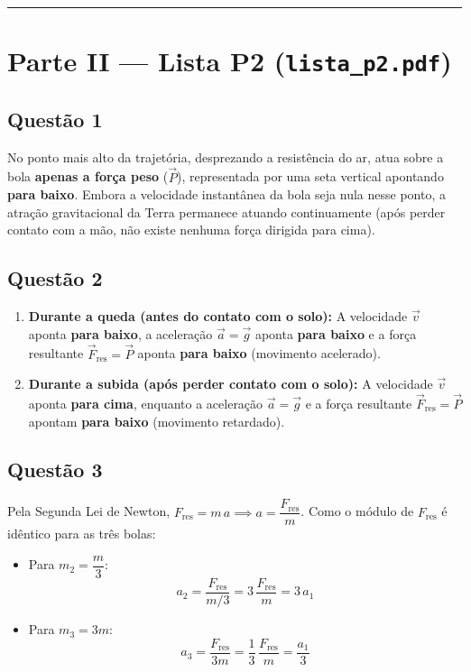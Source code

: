 \documentclass[11pt, a4paper]{article}
\begin{document}
\vspace{6pt}
\hrule
\vspace{8pt}

\section*{\color{primary} Parte II --- Lista P2 (\texttt{lista\_p2.pdf})}

\subsection*{Questão 1}
No ponto mais alto da trajetória, desprezando a resistência do ar, atua sobre a bola \textbf{apenas a força peso} ($\vec{P}$), representada por uma seta vertical apontando \textbf{para baixo}. Embora a velocidade instantânea da bola seja nula nesse ponto, a atração gravitacional da Terra permanece atuando continuamente (após perder contato com a mão, não existe nenhuma força dirigida para cima).

\subsection*{Questão 2}
\begin{enumerate}[label=\textbf{(\alph*)}]
    \item \textbf{Durante a queda (antes do contato com o solo):}
    A velocidade $\vec{v}$ aponta \textbf{para baixo}, a aceleração $\vec{a} = \vec{g}$ aponta \textbf{para baixo} e a força resultante $\vec{F}_{\text{res}} = \vec{P}$ aponta \textbf{para baixo} (movimento acelerado).

    \item \textbf{Durante a subida (após perder contato com o solo):}
    A velocidade $\vec{v}$ aponta \textbf{para cima}, enquanto a aceleração $\vec{a} = \vec{g}$ e a força resultante $\vec{F}_{\text{res}} = \vec{P}$ apontam \textbf{para baixo} (movimento retardado).
\end{enumerate}

\subsection*{Questão 3}
Pela Segunda Lei de Newton, $F_{\text{res}} = m\,a \implies a = \dfrac{F_{\text{res}}}{m}$. Como o módulo de $F_{\text{res}}$ é idêntico para as três bolas:
\begin{itemize}
    \item Para $m_2 = \dfrac{m}{3}$:
    \[
        a_2 = \frac{F_{\text{res}}}{m/3} = 3\,\frac{F_{\text{res}}}{m} = 3\,a_1
    \]
    \item Para $m_3 = 3m$:
    \[
        a_3 = \frac{F_{\text{res}}}{3m} = \frac{1}{3}\,\frac{F_{\text{res}}}{m} = \frac{a_1}{3}
    \]
\end{itemize}
\end{document}
